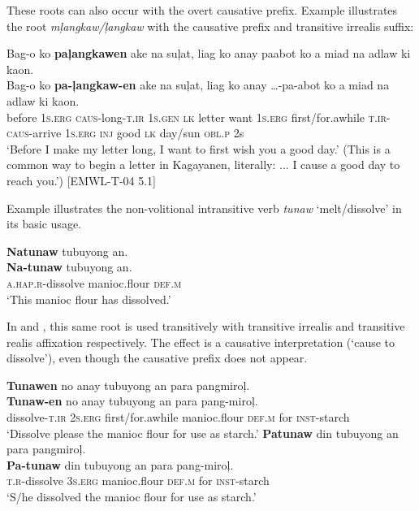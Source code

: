 These roots can also occur with the overt causative prefix. Example  illustrates the root \textit{mļangkaw/ļangkaw} with the causative prefix and transitive irrealis suffix:

\ea
\label{bkm:Ref395081078}
Bag-o  ko  \textbf{paļangkawen}  ake  na  suļat,  liag  ko  anay paabot  ko  a  miad  na  adlaw  ki  kaon. \\\smallskip
\gll Bag-o  ko  \textbf{pa-ļangkaw-en}  ake  na  suļat,  liag  ko  anay …-pa-abot  ko  a  miad  na  adlaw  ki  kaon. \\
before  1\textsc{s.erg}  \textsc{caus}-long-\textsc{t.ir}  1\textsc{s.gen}  \textsc{lk}  letter  want  1\textsc{s.erg}  first/for.awhile
\textsc{t.ir-caus}-arrive  1\textsc{s.erg}  \textsc{inj}  good  \textsc{lk}  day/sun  \textsc{obl.p}  2s \\
\glt `Before I make my letter long, I want to first wish you a good day.’ (This is a common way to begin a letter in Kagayanen, literally: ... I cause a good day to reach you.’) [EMWL-T-04 5.1]
\z

Example  illustrates the non-volitional intransitive verb \textit{tunaw} ‘melt/dissolve’ in its basic usage.

\ea
\label{bkm:Ref395110780}
\textbf{Natunaw}  tubuyong  an. \\\smallskip
\gll \textbf{Na-tunaw}  tubuyong  an. \\
\textsc{a.hap.r}-dissolve  manioc.flour  \textsc{def.m} \\
\glt ‘This manioc flour has dissolved.’
\z

In  and , this same root is used transitively with transitive irrealis and transitive realis affixation respectively. The effect is a causative interpretation (`cause to dissolve'), even though the causative prefix does not appear.

\ea
\label{bkm:Ref395110927}
\textbf{Tunawen}  no  anay  tubuyong  an  para  pangmiroļ. \\\smallskip
\gll \textbf{Tunaw-en}  no  anay  tubuyong  an  para  pang-miroļ. \\
dissolve-\textsc{t.ir}  2\textsc{s.erg}  first/for.awhile  manioc.flour  \textsc{def.m}  for  \textsc{inst}-starch \\
\glt ‘Dissolve please the manioc flour for use as starch.’
\z
\ea
\label{bkm:Ref122956811}
\textbf{Patunaw}  din  tubuyong  an  para  pangmiroļ. \\\smallskip
\gll \textbf{Pa-tunaw}  din  tubuyong  an  para  pang-miroļ. \\
\textsc{t.r}-dissolve  3\textsc{s.erg}  manioc.flour  \textsc{def.m}  for  \textsc{inst}-starch \\
\glt ‘S/he dissolved the manioc flour for use as starch.’
\z

